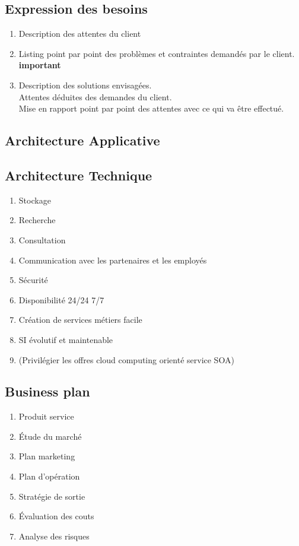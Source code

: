 \subsection{Expression des besoins}
\begin{enumerate}
  \item Description des attentes du client
  \item Listing point par point des problèmes et contraintes demandés par le
    client. \textbf{important}
  \item Description des solutions envisagées.
    \\ Attentes déduites des demandes du client.
    \\ Mise en rapport point par point des attentes avec ce qui va être
    effectué.
\end{enumerate}

\subsection{Architecture Applicative}


\subsection{Architecture Technique}
\begin{enumerate}
  \item Stockage
  \item Recherche
  \item Consultation
  \item Communication avec les partenaires et les employés
  \item Sécurité
  \item Disponibilité 24/24 7/7
  \item Création de services métiers facile
  \item SI évolutif et maintenable
  \item (Privilégier les offres cloud computing orienté service SOA)
\end{enumerate}

\subsection{Business plan}
\begin{enumerate}
  \item Produit service
  \item Étude du marché
  \item Plan marketing
  \item Plan d'opération
  \item Stratégie de sortie
  \item Évaluation des couts
  \item Analyse des risques
\end{enumerate}

